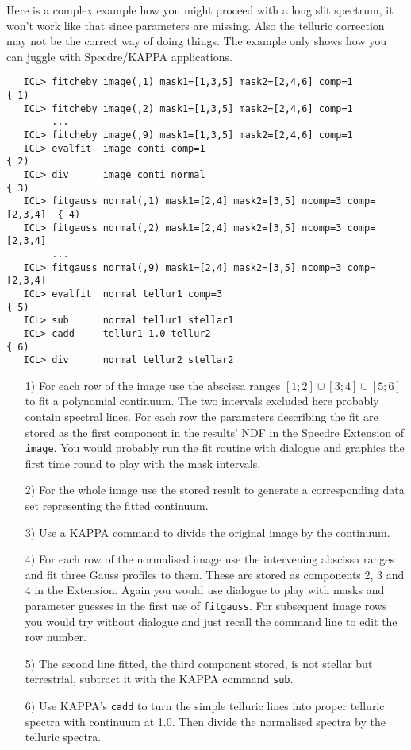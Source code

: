 Here is a complex example how you might proceed with a long slit
spectrum, it won't work like that since parameters are missing. Also the
telluric correction may not be the correct way of doing things. The
example only shows how you can juggle with Specdre/KAPPA applications.

\begin{verbatim}
   ICL> fitcheby image(,1) mask1=[1,3,5] mask2=[2,4,6] comp=1             { 1)
   ICL> fitcheby image(,2) mask1=[1,3,5] mask2=[2,4,6] comp=1
        ...
   ICL> fitcheby image(,9) mask1=[1,3,5] mask2=[2,4,6] comp=1
   ICL> evalfit  image conti comp=1                                       { 2)
   ICL> div      image conti normal                                       { 3)
   ICL> fitgauss normal(,1) mask1=[2,4] mask2=[3,5] ncomp=3 comp=[2,3,4]  { 4)
   ICL> fitgauss normal(,2) mask1=[2,4] mask2=[3,5] ncomp=3 comp=[2,3,4]
        ...
   ICL> fitgauss normal(,9) mask1=[2,4] mask2=[3,5] ncomp=3 comp=[2,3,4]
   ICL> evalfit  normal tellur1 comp=3                                    { 5)
   ICL> sub      normal tellur1 stellar1
   ICL> cadd     tellur1 1.0 tellur2                                      { 6)
   ICL> div      normal tellur2 stellar2
\end{verbatim}

\begin{itemize}
\item[1)] For each row of the image use the abscissa ranges
   $[1;2]\cup[3;4]\cup[5;6]$ to fit a polynomial continuum. The two
   intervals excluded here probably contain spectral lines. For each row
   the parameters describing the fit are stored as the first component
   in the results' NDF in the Specdre Extension of {\tt image}. You
   would probably run the fit routine with dialogue and graphics the
   first time round to play with the mask intervals.

\item[2)] For the whole image use the stored result to generate a
   corresponding data set representing the fitted continuum.

\item[3)] Use a KAPPA command to divide the original image by the
   continuum.

\item[4)] For each row of the normalised image use the intervening
   abscissa ranges and fit three Gauss profiles to them. These are stored
   as components 2, 3 and 4 in the Extension. Again you would use
   dialogue to play with masks and parameter guesses in the first use of
   {\tt fitgauss}.  For subsequent image rows you would try without
   dialogue and just recall the command line to edit the row number.

\item[5)] The second line fitted, the third component stored, is not
   stellar but terrestrial, subtract it with the KAPPA command {\tt sub}.

\item[6)] Use KAPPA's {\tt cadd} to turn the simple telluric lines into
   proper telluric spectra with continuum at 1.0. Then divide the
   normalised spectra by the telluric spectra.

\end{itemize}


